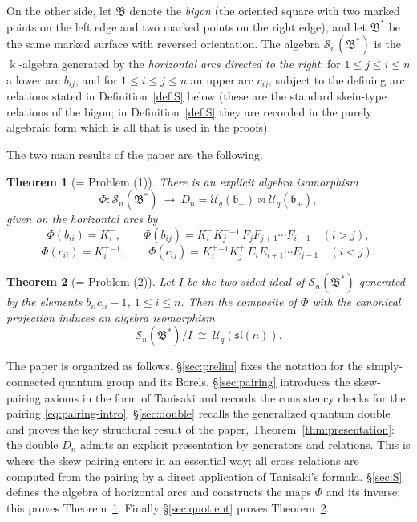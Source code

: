 \documentclass[11pt]{amsart}
\newcommand{\bk}{\Bbbk}
\newcommand{\U}{\mathscr U}
\newcommand{\sl}{\mathfrak{sl}}
\newcommand{\fb}{\mathfrak b}
\newcommand{\KP}{K^{+}}
\newcommand{\KM}{K^{-}}
\theoremstyle{plain}
\newtheorem{theorem}{Theorem}[section]
\theoremstyle{definition}
\numberwithin{equation}{section}
\begin{document}
On the other side, let $\mathfrak B$ denote the \emph{bigon} (the oriented
square with two marked points on the left edge and two marked points on the
right edge), and let $\mathfrak B^*$ be the same marked surface with reversed
orientation.  The algebra $\mathscr S_n(\mathfrak B^*)$ is the $\bk$-algebra
generated by the \emph{horizontal arcs directed to the right}: for
$1\le j\le i\le n$ a lower arc $b_{ij}$, and for $1\le i\le j\le n$ an upper
arc $c_{ij}$, subject to the defining arc relations stated in
Definition~\ref{def:S} below (these are the standard skein-type relations of
the bigon; in Definition~\ref{def:S} they are recorded in the purely algebraic
form which is all that is used in the proofs).

The two main results of the paper are the following.

\begin{theorem}[= Problem (1)]\label{thm:A}
There is an explicit algebra isomorphism
\[
\Phi:\mathscr S_n(\mathfrak B^*)\ \longrightarrow\
D_n=\U_q(\fb_-)\bowtie\U_q(\fb_+),
\]
given on the horizontal arcs by
\begin{equation}\label{eq:Phi-intro}
\Phi(b_{ii})=\KM_i,\qquad
\Phi(b_{ij})=\KM_i\KM_j^{-1}\,F_jF_{j+1}\cdots F_{i-1}\quad(i>j),
\end{equation}
\begin{equation}\label{eq:Phi-intro2}
\Phi(c_{ii})=\KP_i^{-1},\qquad
\Phi(c_{ij})=\KP_i^{-1}\KP_j\,E_iE_{i+1}\cdots E_{j-1}\quad(i<j).
\end{equation}
\end{theorem}

\begin{theorem}[= Problem (2)]\label{thm:B}
Let $I$ be the two-sided ideal of $\mathscr S_n(\mathfrak B^*)$ generated by
the elements $b_{ii}c_{ii}-1$, $1\le i\le n$.  Then the composite of
$\Phi$ with the canonical projection induces an algebra isomorphism
\[
\mathscr S_n(\mathfrak B^*)/I\ \cong\ \U_q(\sl(n)).
\]
\end{theorem}

The paper is organized as follows.  \S\ref{sec:prelim} fixes the notation for
the simply-connected quantum group and its Borels.  \S\ref{sec:pairing}
introduces the skew-pairing axioms in the form of Tanisaki and records the
consistency checks for the pairing \eqref{eq:pairing-intro}.
\S\ref{sec:double} recalls the generalized quantum double and proves the
key structural result of the paper, Theorem~\ref{thm:presentation}: the double
$D_n$ admits an explicit presentation by generators and relations.  This is
where the skew pairing enters in an essential way; all cross relations are
computed from the pairing by a direct application of Tanisaki's formula.
\S\ref{sec:S} defines the algebra of horizontal arcs and constructs the maps
$\Phi$ and its inverse; this proves Theorem~\ref{thm:A}.  Finally
\S\ref{sec:quotient} proves Theorem~\ref{thm:B}.
\end{document}
